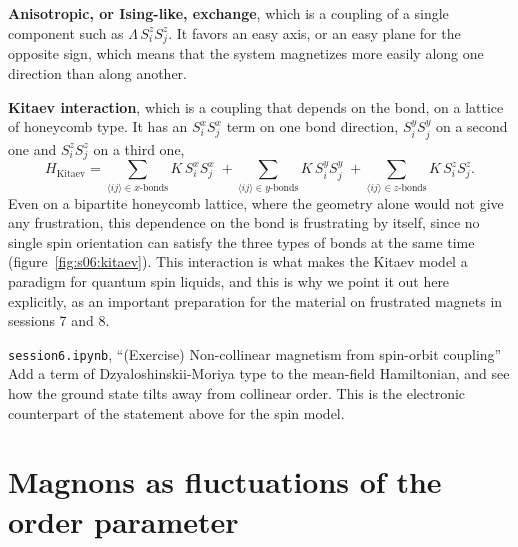 \textbf{Anisotropic, or Ising-like, exchange}, which is a coupling of a single component such as
$\Lambda\, S_i^z S_j^z$. It favors an easy axis, or an easy plane for the opposite sign, which means
that the system magnetizes more easily along one direction than along another.

\textbf{Kitaev interaction}, which is a coupling that depends on the bond, on a lattice of honeycomb
type. It has an $S^x_iS^x_j$ term on one bond direction, $S^y_iS^y_j$ on a second one and
$S^z_iS^z_j$ on a third one,
\begin{equation*}
H_\text{Kitaev} = \sum_{\langle ij\rangle \in x\text{-bonds}}\! K\, S_i^xS_j^x \;+\!\!\sum_{\langle ij\rangle \in y\text{-bonds}}\!\! K\, S_i^yS_j^y \;+\!\!\sum_{\langle ij\rangle \in z\text{-bonds}}\!\! K\, S_i^zS_j^z.
\end{equation*}
Even on a bipartite honeycomb lattice, where the geometry alone would not give any frustration, this
dependence on the bond is frustrating by itself, since no single spin orientation can satisfy the
three types of bonds at the same time (figure~\ref{fig:s06:kitaev}). This interaction is what makes the
Kitaev model a paradigm for quantum spin liquids, and this is why we point it out here explicitly, as
an important preparation for the material on frustrated magnets in sessions 7 and 8.



\begin{notebookbox}{\texttt{session6.ipynb}, ``(Exercise) Non-collinear magnetism from spin-orbit coupling''}
Add a term of Dzyaloshinskii-Moriya type to the mean-field Hamiltonian, and see how the ground state
tilts away from collinear order. This is the electronic counterpart of the statement above for the
spin model.
\end{notebookbox}

\section{Magnons as fluctuations of the order parameter}

